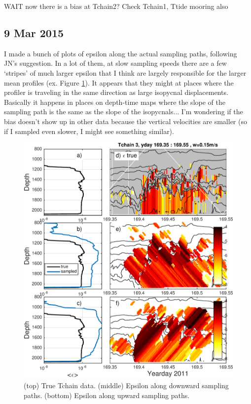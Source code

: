 \documentclass[11pt]{article}
\begin{document}
WAIT now there is a bias at Tchain2? Check Tchain1, Ttide mooring also




\clearpage
\newpage
\subsection{9 Mar 2015}


I made a bunch of plots of epsilon along the actual sampling paths, following JN's suggestion. In a lot of them, at slow sampling speeds there are a few `stripes' of much larger epsilon that I think are largely responsible for the larger mean profiles (ex. Figure \ref{9Mar_1}). It appears that they might at places where the profiler is traveling in the same direction as large isopycnal displacements. Basically it happens in places on depth-time maps where the slope of the sampling path is the same as the slope of the isopycnals... I'm wondering if the bias doesn't show up in other data because the vertical velocities are smaller (so if I sampled even slower, I might see something similar). 


\begin{figure}[htbp]
\includegraphics[scale=0.8]{Tchain3_AlongPath_NearDay169_Test_3.pdf}
\caption{(top) True Tchain data. (middle) Epsilon along downward sampling paths. (bottom) Epsilon along upward sampling paths.}
\label{9Mar_1}
\end{figure}
\end{document}
